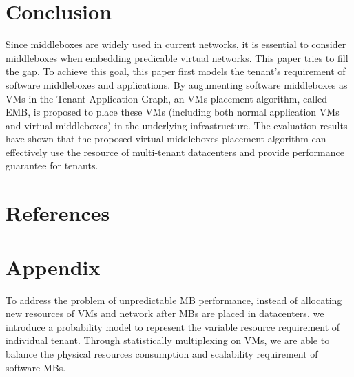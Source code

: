 \documentclass[review]{elsarticle}
\begin{document}

\section{Conclusion}\label{sec:final}
Since middleboxes are widely used in current networks, it is essential to consider middleboxes when embedding predicable virtual networks. This paper tries to fill the gap. To achieve this goal, this paper first models the tenant's requirement of software middleboxes and applications. By augumenting software middleboxes as VMs in the Tenant Application Graph, an VMs placement algorithm, called EMB, is proposed to place these VMs (including both normal application VMs and virtual middleboxes) in the underlying infrastructure. The evaluation results have shown that the proposed virtual middleboxes placement algorithm can effectively use the resource of multi-tenant datacenters and provide performance guarantee for tenants.   

 






%
\section*{References}



\section*{Appendix}
\appendix
To address the problem of unpredictable MB performance, instead of allocating new resources of VMs and network after MBs are placed in datacenters, we introduce a probability model to represent the variable resource requirement of individual tenant. Through statistically multiplexing on VMs, we are able to balance the physical resources consumption and scalability requirement of software MBs. 
\end{document}
